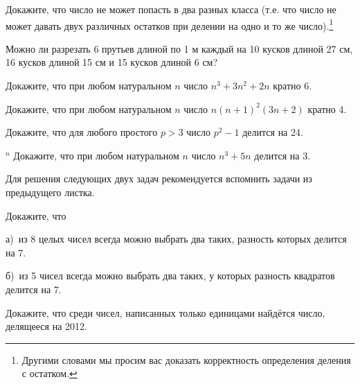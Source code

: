 
\begin{thm}
    Докажите, что число не может попасть в два разных класса (т.е. что число не может давать двух различных остатков при делении на одно и то же число).\footnote{Другими словами мы просим вас доказать корректность определения деления с остатком.}
\end{thm}
    
\begin{thm}
    Можно ли разрезать 6 прутьев длиной по 1 м каждый на 10 кусков длиной 27 см, 16 кусков длиной 15 см и 15 кусков длиной 6 см?
\end{thm}

\begin{thm}
    Докажите, что при любом натуральном $n$ число $n^3 + 3n^2 + 2n$ кратно 6.
\end{thm}

\begin{thm}
    Докажите, что при любом натуральном $n$ число $n(n + 1)^2(3n + 2)$ кратно 4.
\end{thm}

\begin{thm}
    Докажите, что для любого простого $p > 3$ число $p^2 - 1$ делится на 24.
\end{thm}

\begin{thm} $^n$ \label{4.2 thm1}
    Докажите, что при любом натуральном $n$ число $n^3 + 5n$ делится на 3. 
\end{thm}  

\begin{center}
Для решения следующих двух задач рекомендуется вспомнить задачи из предыдущего листка. 
\end{center}

\begin{thm} Докажите, что
    \par 
    а)~из 8 целых чисел всегда можно выбрать два таких, разность которых делится на 7. 
    \par 
    б)~из 5 чисел всегда можно выбрать два таких, у которых разность квадратов делится на 7.
\end{thm}

\begin{thm}
    Докажите, что среди чисел, написанных только единицами найдётся число,
    \\
    делящееся на 2012.
\end{thm}

